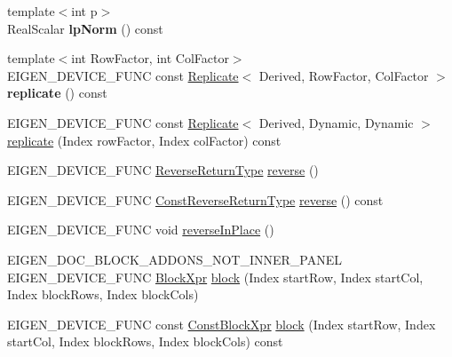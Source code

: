 \begin{DoxyCompactItemize}
{\footnotesize template$<$int p$>$ }\\Real\+Scalar {\bfseries lp\+Norm} () const
\item 
\mbox{\label{class_eigen_1_1_dense_base_a3df7a5a03c308b1890c727c0070dee2c}} 
{\footnotesize template$<$int Row\+Factor, int Col\+Factor$>$ }\\E\+I\+G\+E\+N\+\_\+\+D\+E\+V\+I\+C\+E\+\_\+\+F\+U\+NC const \mbox{\hyperlink{class_eigen_1_1_replicate}{Replicate}}$<$ Derived, Row\+Factor, Col\+Factor $>$ {\bfseries replicate} () const
\item 
E\+I\+G\+E\+N\+\_\+\+D\+E\+V\+I\+C\+E\+\_\+\+F\+U\+NC const \mbox{\hyperlink{class_eigen_1_1_replicate}{Replicate}}$<$ Derived, Dynamic, Dynamic $>$ \mbox{\hyperlink{class_eigen_1_1_dense_base_a4475dc25a383c84656f5c55b890ecacf}{replicate}} (Index row\+Factor, Index col\+Factor) const
\item 
E\+I\+G\+E\+N\+\_\+\+D\+E\+V\+I\+C\+E\+\_\+\+F\+U\+NC \mbox{\hyperlink{class_eigen_1_1_reverse}{Reverse\+Return\+Type}} \mbox{\hyperlink{class_eigen_1_1_dense_base_a38ea394036d8b096abf322469c80198f}{reverse}} ()
\item 
E\+I\+G\+E\+N\+\_\+\+D\+E\+V\+I\+C\+E\+\_\+\+F\+U\+NC \mbox{\hyperlink{class_eigen_1_1_reverse}{Const\+Reverse\+Return\+Type}} \mbox{\hyperlink{class_eigen_1_1_dense_base_ada2ea028e35de0beef990fa0f6e3dee1}{reverse}} () const
\item 
E\+I\+G\+E\+N\+\_\+\+D\+E\+V\+I\+C\+E\+\_\+\+F\+U\+NC void \mbox{\hyperlink{class_eigen_1_1_dense_base_adb8045155ea45f7961fc2a5170e1d921}{reverse\+In\+Place}} ()
\item 
E\+I\+G\+E\+N\+\_\+\+D\+O\+C\+\_\+\+B\+L\+O\+C\+K\+\_\+\+A\+D\+D\+O\+N\+S\+\_\+\+N\+O\+T\+\_\+\+I\+N\+N\+E\+R\+\_\+\+P\+A\+N\+EL E\+I\+G\+E\+N\+\_\+\+D\+E\+V\+I\+C\+E\+\_\+\+F\+U\+NC \mbox{\hyperlink{class_eigen_1_1_block}{Block\+Xpr}} \mbox{\hyperlink{class_eigen_1_1_dense_base_ab8e42e67c5cfd5fa13e684642f0f65bf}{block}} (Index start\+Row, Index start\+Col, Index block\+Rows, Index block\+Cols)
\item 
\mbox{\label{class_eigen_1_1_dense_base_a62031481df360a63794c4227140546cd}} 
E\+I\+G\+E\+N\+\_\+\+D\+E\+V\+I\+C\+E\+\_\+\+F\+U\+NC const \mbox{\hyperlink{class_eigen_1_1_block}{Const\+Block\+Xpr}} \mbox{\hyperlink{class_eigen_1_1_dense_base_a62031481df360a63794c4227140546cd}{block}} (Index start\+Row, Index start\+Col, Index block\+Rows, Index block\+Cols) const

\end{DoxyCompactItemize}
